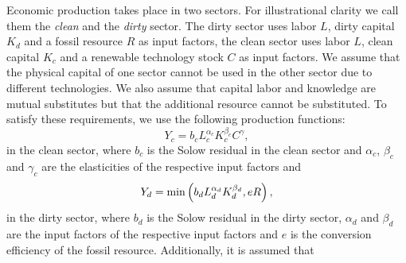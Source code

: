 Economic production takes place in two sectors. For illustrational clarity we call them the \textit{clean} and the \textit{dirty} sector. The dirty sector uses labor $L$, dirty capital $K_d$ and a fossil resource $R$ as input factors, the clean sector uses labor $L$, clean capital $K_c$ and a renewable technology stock $C$ as input factors. We assume that the physical capital of one sector cannot be used in the other sector due to different technologies. We also assume that capital labor and knowledge are mutual substitutes but that the additional resource cannot be substituted. To satisfy these requirements, we use the following production functions:
\begin{equation}
	Y_c = b_c L_c^{\alpha_c}K_c^{\beta_c}C^{\gamma}, 
	\label{eq:clean_production}
\end{equation}
in the clean sector, where $b_c$ is the Solow residual in the clean sector and $\alpha_c$, $\beta_c$ and $\gamma_c$ are the elasticities of the respective input factors and
\begin{equation}
	Y_d = {\rm min}\left( b_d L_d^{\alpha_d}K_d^{\beta_d}, e R \right),
	\label{eq:dirty_production}
\end{equation}
in the dirty sector, where $b_d$ is the Solow residual in the dirty sector, $\alpha_d$ and $\beta_d$ are the input factors of the respective input factors and $e$ is the conversion efficiency of the fossil resource.
Additionally, it is assumed that
